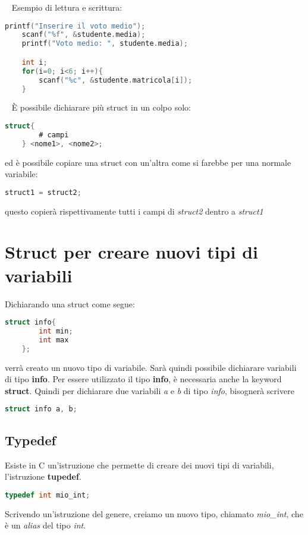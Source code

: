 \documentclass[a4paper,11pt,oneside]{book}
\begin{document}
~\newline
Esempio di lettura e scrittura:
\begin{lstlisting}[language=C]
    printf("Inserire il voto medio");
    scanf("%f", &studente.media);
    printf("Voto medio: ", studente.media);

    int i;
    for(i=0; i<6; i++){
        scanf("%c", &studente.matricola[i]);
    }
\end{lstlisting}

~\newline
È possibile dichiarare più struct in un colpo solo:
\begin{lstlisting}[language=C]
    struct{
        # campi
    } <nome1>, <nome2>;
\end{lstlisting}
ed è possibile copiare una struct con un'altra come si farebbe per una normale variabile:
\begin{lstlisting}[language=C]
    struct1 = struct2;
\end{lstlisting}
questo copierà rispettivamente tutti i campi di \emph{struct2} dentro a \emph{struct1}

\section{Struct per creare nuovi tipi di variabili}
Dichiarando una struct come segue:
\begin{lstlisting}[language=C]
    struct info{
        int min;
        int max
    };
\end{lstlisting}
verrà creato un nuovo tipo di variabile. Sarà quindi possibile dichiarare variabili di tipo \textbf{info}.
Per essere utilizzato il tipo \textbf{info}, è necessaria anche la keyword \textbf{struct}. Quindi per 
dichiarare due variabili \emph{a} e \emph{b} di tipo \emph{info}, bisognerà scrivere
\begin{lstlisting}[language=C]
    struct info a, b;
\end{lstlisting}

\subsection{Typedef}
Esiste in C un'istruzione che permette di creare dei nuovi tipi di variabili, l'istruzione \textbf{tupedef}.
\begin{lstlisting}[language=C]
    typedef int mio_int; 
\end{lstlisting}
Scrivendo un'istruzione del genere, creiamo un nuovo tipo, chiamato \emph{mio\_int}, che è un \emph{alias} del tipo \emph{int}.
\end{document}
